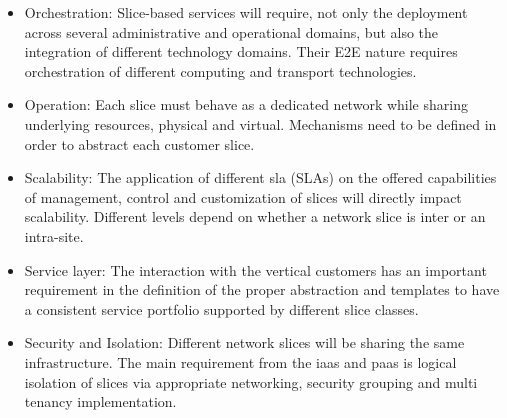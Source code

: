 \begin{itemize}
    \item Orchestration: Slice-based services will require, not only the deployment across several administrative and operational domains, but also the integration of different technology domains. Their E2E nature requires orchestration of different computing and transport technologies.
    \item Operation: Each slice must behave as a dedicated network while sharing underlying resources, physical and virtual. Mechanisms need to be defined in order to abstract each customer slice.
    \item Scalability: The application of different \acrlong{sla} (SLAs) on the offered capabilities of management, control and customization of slices will directly impact scalability. Different levels depend on whether a network slice is inter or an intra-site.
    \item Service layer: The interaction with the vertical customers has an important requirement in the definition of the proper abstraction and templates to have a consistent service portfolio supported by different slice classes.
    \item Security and Isolation: Different network slices will be sharing the same infrastructure. The main requirement from the  \acrfull{iaas} and \acrfull{paas} is logical isolation of slices via appropriate networking, security grouping and multi tenancy implementation.
\end{itemize}

\newpage


